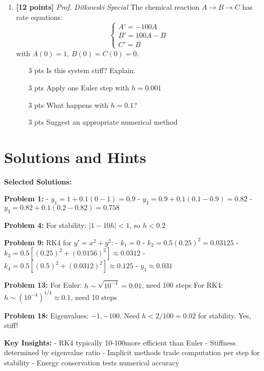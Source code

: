 \documentclass[12pt]{article}
\begin{document}
\begin{enumerate}[resume]
\item \textbf{[12 points]} \textit{Prof. Ditkowski Special}
The chemical reaction $A \to B \to C$ has rate equations:
$$\begin{cases}
A' = -100A \\
B' = 100A - B \\
C' = B
\end{cases}$$
with $A(0) = 1$, $B(0) = C(0) = 0$.
\begin{enumerate}[label=(\alph*)]
\item [3 pts] Is this system stiff? Explain.
\item [3 pts] Apply one Euler step with $h = 0.001$
\item [3 pts] What happens with $h = 0.1$?
\item [3 pts] Suggest an appropriate numerical method
\end{enumerate}
\end{enumerate}

\section*{Solutions and Hints}

\textbf{Selected Solutions:}

\textbf{Problem 1:}
- $y_{1} = 1 + 0.1(0 - 1) = 0.9$
- $y_{2} = 0.9 + 0.1(0.1 - 0.9) = 0.82$
- $y_{3} = 0.82 + 0.1(0.2 - 0.82) = 0.758$

\textbf{Problem 4:} For stability: $|1 - 10h| < 1$, so $h < 0.2$

\textbf{Problem 9:} RK4 for $y' = x^{2} + y^{2}$:
- $k_{1} = 0$
- $k_{2} = 0.5(0.25)^{2} = 0.03125$
- $k_{3} = 0.5[(0.25)^{2} + (0.0156)^{2}] \approx 0.0312$
- $k_{4} = 0.5[(0.5)^{2} + (0.0312)^{2}] \approx 0.125$
- $y_{1} \approx 0.031$

\textbf{Problem 13:} For Euler: $h \sim \sqrt{10^{-4}} = 0.01$, need 100 steps
For RK4: $h \sim (10^{-4})^{1/4} \approx 0.1$, need 10 steps

\textbf{Problem 18:} Eigenvalues: $-1, -100$. Need $h < 2/100 = 0.02$ for stability. Yes, stiff!

\textbf{Key Insights:}
- RK4 typically 10-100\times more efficient than Euler
- Stiffness determined by eigenvalue ratio
- Implicit methods trade computation per step for stability
- Energy conservation tests numerical accuracy
\end{document}
